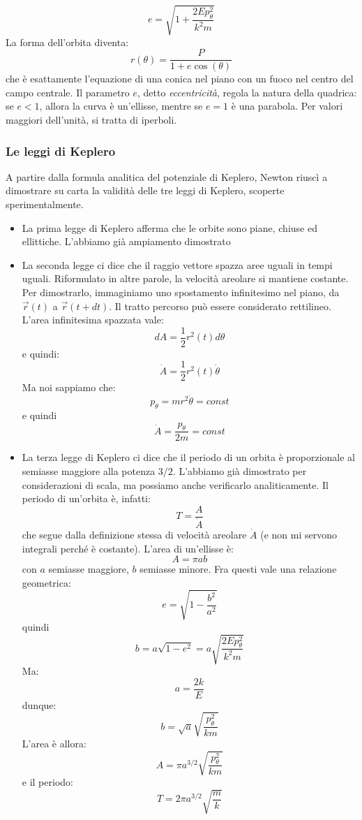 \documentclass[a4paper,openany]{article}
\begin{document}
	\begin{equation}
		e =\sqrt{1+\dfrac{2Ep_{\theta}^2}{k^2m}}
	\end{equation}
	La forma dell'orbita diventa:
	\begin{equation}\label{key}
		r(\theta) = \dfrac{P}{1+e\cos(\theta)}
	\end{equation}
	che è esattamente l'equazione di una conica nel piano con un fuoco nel centro del campo centrale. Il parametro $e$, detto \textit{eccentricità}, regola la natura della quadrica: se $e<1$, allora la curva è un'ellisse, mentre se $e=1$ è una parabola. Per valori maggiori dell'unità, si tratta di iperboli.
	\subsubsection{Le leggi di Keplero}
	A partire dalla formula analitica del potenziale di Keplero, Newton riuscì a dimostrare su carta la validità delle tre leggi di Keplero, scoperte sperimentalmente.
	\begin{itemize}
		\item La prima legge di Keplero afferma che le orbite sono piane, chiuse ed ellittiche. L'abbiamo già ampiamento dimostrato
		\item La seconda legge ci dice che il raggio vettore spazza aree uguali in tempi uguali. Riformulato in altre parole, la velocità areolare si mantiene costante. Per dimostrarlo, immaginiamo uno spostamento infinitesimo nel piano, da $\vec{r}(t)$ a $\vec{r}(t+dt)$. Il tratto percorso può essere considerato rettilineo. L'area infinitesima spazzata vale:
		$$
		dA = \dfrac{1}{2}r^2(t)d\theta
		$$
		e quindi:
		$$
		\dot{A} = \dfrac{1}{2}r^2(t)\dot{\theta}
		$$
		Ma noi sappiamo che:
		$$
		p_{\theta} = mr^2\dot{\theta} = const
		$$
		e quindi
		$$
		\dot{A} = \dfrac{p_{\theta}}{2m} = const
		$$
		\item La terza legge di Keplero ci dice che il periodo di un orbita è proporzionale al semiasse maggiore alla potenza $3/2$. L'abbiamo già dimostrato per considerazioni di scala, ma possiamo anche verificarlo analiticamente. Il periodo di un'orbita è, infatti:
		$$
		T = \dfrac{A}{\dot{A}}
		$$
		che segue dalla definizione stessa di velocità areolare $\dot{A}$ (e non mi servono integrali perché è costante). L'area di un'ellisse è:
		$$
		A = \pi ab
		$$
		con $a$ semiasse maggiore, $b$ semiasse minore. Fra questi vale una relazione geometrica:
		$$
		e = \sqrt{1-\dfrac{b^2}{a^2}}
		$$
		quindi
		$$
		b = a\sqrt{1-e^2} = a\sqrt{\dfrac{2Ep_{\theta}^2}{k^2m}}
		$$
		Ma:
		$$
		a = \dfrac{2k}{E}
		$$
		dunque:
		$$
		b = \sqrt{a}\sqrt{\dfrac{p_{\theta}^2}{km}}
		$$
		L'area è allora:
		$$
		A = \pi a^{3/2}\sqrt{\dfrac{p_{\theta}^2}{km}}
		$$
		e il periodo:
		$$
		T = 2\pi a^{3/2}\sqrt{\dfrac{m}{k}}
		$$
	\end{itemize}
	\newpage
\end{document}
